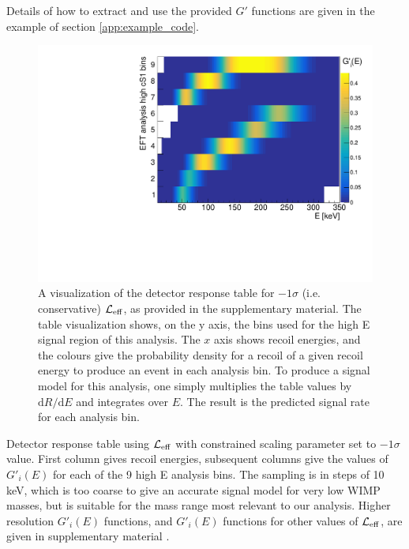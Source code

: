 Details of how to extract and use the provided $G'$ functions are given in the example of section \ref{app:example_code}. 

\begin{figure}
\centerline{\includegraphics[width=1.\linewidth]{Figures/smeartable_highE}}
\caption{A visualization of the detector response table for $-1\sigma$ (i.e. conservative) $\mathcal{L}_{\mathrm{eff}}$, as provided in the supplementary material. The table visualization shows, on the y axis, the bins used for the high E signal region of this analysis. The $x$ axis shows recoil energies, and the colours give the probability density for a recoil of a given recoil energy to produce an event in each analysis bin. To produce a signal model for this analysis, one simply multiplies the table values by $\mathrm{d}R/\mathrm{d}E$ and integrates over $E$. The result is the predicted signal rate for each analysis bin.}
\label{fig:smeartable_highE}
\end{figure}  

\begin{table}
{
  \lstset{tabsize=4,basicstyle=\tiny\ttfamily,columns=flexible,emptylines=10000,keepspaces=true}
  
}
\caption{Detector response table using $\mathcal{L}_{\mathrm{eff}}$ with constrained scaling parameter set to $-1\sigma$ value. First column gives recoil energies, subsequent columns give the values of $G'_i(E)$ for each of the 9 high E analysis bins. The sampling is in steps of 10 keV, which is too coarse to give an accurate signal model for very low WIMP masses, but is suitable for the mass range most relevant to our analysis. Higher resolution $G'_i(E)$ functions, and $G'_i(E)$ functions for other values of $\mathcal{L}_{\mathrm{eff}}$, are given in supplementary material . 
\label{tab:smeartable_highE}
}
\end{table}  
